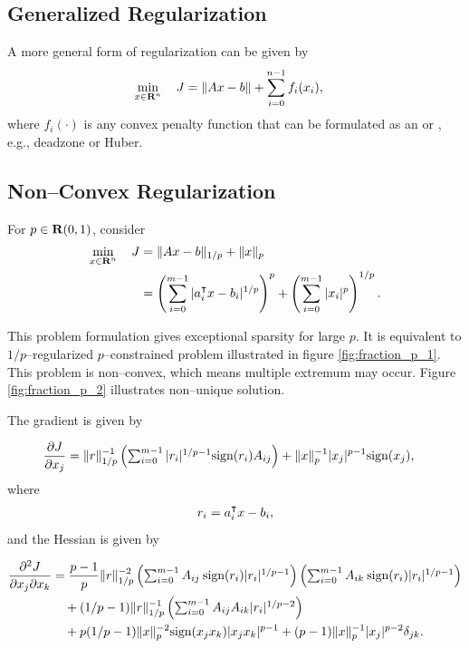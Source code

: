\documentclass{article}
\begin{document}

\clearpage
\subsection{Generalized Regularization}

A more general form of regularization can be given by
\begin{align*}
    \min_{x\in\textbf{R}^n}\quad J &= \|Ax-b\|+\sum_{i=0}^{n-1}f_i(x_i),
\end{align*}
where $f_i(\cdot)$ is any convex penalty function that can be 
formulated as an \LP or \QP, e.g.,
deadzone or Huber.

\subsection{Non--Convex Regularization}

    For $p\in\textbf{R}(0,1)$, consider
    \begin{align*}
        \min_{x\in\textbf{R}^n}\quad J &= \|Ax-b\|_{1/p}+\|x\|_p\\
        &= \left(\sum_{i=0}^{m-1} |a_i^\intercal x-b_i|^{1/p}\right)^p
        +\left(\sum_{i=0}^{m-1}|x_i|^p\right)^{1/p}.
    \end{align*}

    This problem formulation gives exceptional sparsity for large $p$.
    It is equivalent to $1/p$--regularized $p$--constrained problem 
    illustrated in figure \ref{fig:fraction_p_1}.
    This problem is non--convex, which means multiple extremum may occur.
    Figure \ref{fig:fraction_p_2} illustrates non--unique solution.

    The gradient is given by

    \begin{align*}
        \frac{\partial J}{\partial x_j}&=\|r\|_{1/p}^{-1}
        \left(\textstyle\sum_{i=0}^{m-1}|r_i|^{1/p-1}\text{sign}(r_i)A_{ij}\right)
        +\|x\|_p^{-1}|x_j|^{p-1}\text{sign}(x_j),
    \end{align*}
    where
    \begin{align*}
        r_i = a_i^\intercal x-b_i,
    \end{align*}
    and the Hessian is given by

    \begin{align*}
        \frac{\partial^2 J}{\partial x_j \partial x_k}&=\frac{p-1}{p}\|r\|_{1/p}^{-2}
        \left(\textstyle\sum_{i=0}^{m-1}A_{ij}\:\text{sign}(r_i)|r_i|^{1/p-1}\right)
        \left(\textstyle\sum_{i=0}^{m-1}A_{ik}\:\text{sign}(r_i)|r_i|^{1/p-1}\right)\\
        &\quad+(1/p-1)\|r\|_{1/p}^{-1}
        \left(\textstyle\sum_{i=0}^{m-1}A_{ij}A_{ik}|r_i|^{1/p-2}\right)\\
        &\quad+p(1/p-1)\|x\|_p^{-2}\text{sign}(x_jx_k)|x_jx_k|^{p-1}
        +(p-1)\|x\|_p^{-1}|x_j|^{p-2}\delta_{jk}.
    \end{align*}
\end{document}
